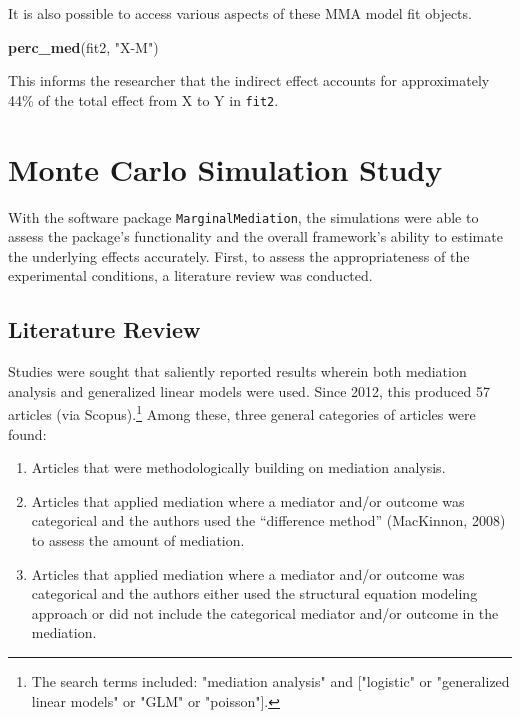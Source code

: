 \documentclass[]{DissertateUSU}
\newenvironment{Shaded}{\begin{snugshade}}{\end{snugshade}}
\newcommand{\KeywordTok}[1]{\textcolor[rgb]{0.13,0.29,0.53}{\textbf{#1}}}
\newcommand{\StringTok}[1]{\textcolor[rgb]{0.31,0.60,0.02}{#1}}
\newcommand{\NormalTok}[1]{#1}
\providecommand{\tightlist}{%
  \setlength{\itemsep}{0pt}\setlength{\parskip}{0pt}}
\let\rmarkdownfootnote\footnote%
\def\footnote{\protect\rmarkdownfootnote}
\begin{document}
\doublespacing

It is also possible to access various aspects of these MMA model fit
objects.

\begin{Shaded}
\begin{Highlighting}[]
\KeywordTok{perc_med}\NormalTok{(fit2, }\StringTok{"X-M"}\NormalTok{)}
\end{Highlighting}
\end{Shaded}

\noindent This informs the researcher that the indirect effect accounts
for approximately 44\% of the total effect from X to Y in \texttt{fit2}.

\section{Monte Carlo Simulation
Study}\label{monte-carlo-simulation-study}

With the software package \texttt{MarginalMediation}, the simulations
were able to assess the package's functionality and the overall
framework's ability to estimate the underlying effects accurately.
First, to assess the appropriateness of the experimental conditions, a
literature review was conducted.

\subsection{Literature Review}\label{literature-review-1}

Studies were sought that saliently reported results wherein both
mediation analysis and generalized linear models were used. Since 2012,
this produced 57 articles (via
Scopus).\footnote{The search terms included: "mediation analysis" and ["logistic" or "generalized linear models" or "GLM" or "poisson"].}
Among these, three general categories of articles were found:

\begin{enumerate}
\def\labelenumi{\arabic{enumi}.}
\tightlist
\item
  Articles that were methodologically building on mediation analysis.
\item
  Articles that applied mediation where a mediator and/or outcome was
  categorical and the authors used the ``difference method'' (MacKinnon,
  2008) to assess the amount of mediation.
\item
  Articles that applied mediation where a mediator and/or outcome was
  categorical and the authors either used the structural equation
  modeling approach or did not include the categorical mediator and/or
  outcome in the mediation.
\end{enumerate}
\end{document}
